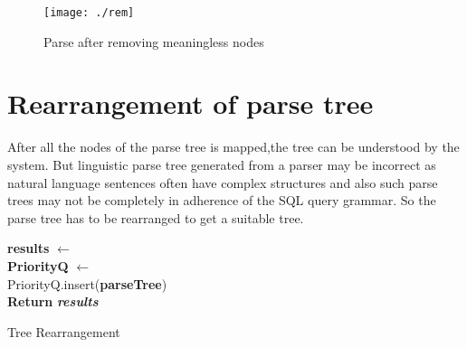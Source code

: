 \begin{figure}[htb]
\centering
\texttt{[image: ./rem]} %
\caption{Parse after removing meaningless nodes}
\label{fig:grammar} %
\end{figure}







\section{Rearrangement of parse tree}
After all the nodes of the parse tree is mapped,the tree can be understood by the system. But linguistic parse tree generated from a parser may be incorrect as natural language sentences often have complex structures and also such parse trees may not be completely in adherence of the SQL query grammar. So the parse tree has to be rearranged to get a suitable tree.\\








\begin{algorithm}[J]
\SetAlgoLined
{}




\BlankLine

\textbf{results} $\leftarrow$ \phi\\
\textbf{PriorityQ} $\leftarrow$ \phi\\
PriorityQ.insert(\textbf{parseTree})\\
\textbf{Return} \textbf{\emph{results}}

 \caption{Tree Rearrangement}
\end{algorithm}








